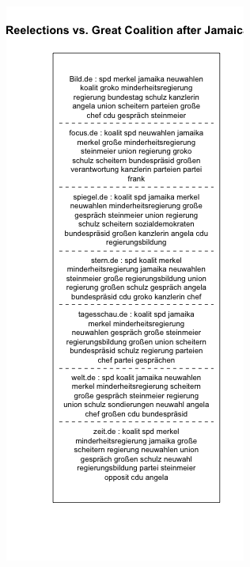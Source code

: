 \documentclass[12pt,a4paper,notitlepage]{article}
\begin{document}
\begin{figure}[H]
	\begin{center}
		\begin{subfigure}[normla]{0.49\textwidth}
			\includegraphics[width=\textwidth]{../figs/plotquote26.png}

\end{subfigure}
\end{center}
\end{figure}
\end{document}
